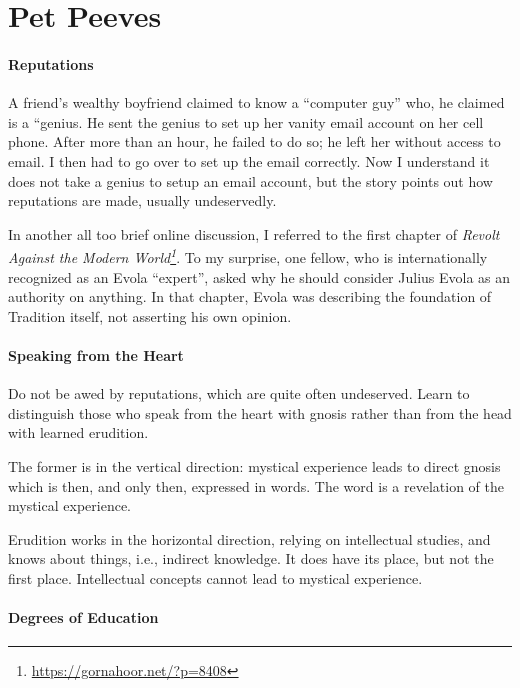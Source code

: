\section{Pet Peeves}

\paragraph{Reputations}


A friend's wealthy boyfriend claimed to know a ``computer guy'' who, he claimed is a ``genius. He sent the genius to set up her vanity email account on her cell phone. After more than an hour, he failed to do so; he left her without access to email. I then had to go over to set up the email correctly. Now I understand it does not take a genius to setup an email account, but the story points out how reputations are made, usually undeservedly.

In another all too brief online discussion, I referred to the first chapter of \emph{Revolt Against the Modern World\footnote{\url{https://gornahoor.net/?p=8408}}}. To my surprise, one fellow, who is internationally recognized as an Evola ``expert'', asked why he should consider Julius Evola as an authority on anything. In that chapter, Evola was describing the foundation of Tradition itself, not asserting his own opinion.

\paragraph{Speaking from the Heart}


Do not be awed by reputations, which are quite often undeserved. Learn to distinguish those who speak from the heart with gnosis rather than from the head with learned erudition.

The former is in the vertical direction: mystical experience leads to direct gnosis which is then, and only then, expressed in words. The word is a revelation of the mystical experience.

Erudition works in the horizontal direction, relying on intellectual studies, and knows about things, i.e., indirect knowledge. It does have its place, but not the first place. Intellectual concepts cannot lead to mystical experience.

\paragraph{Degrees of Education}


